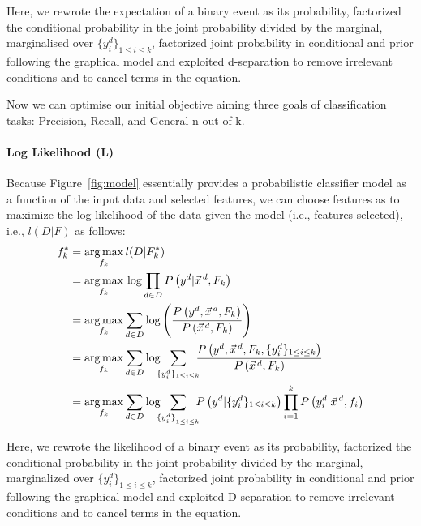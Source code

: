 Here, we rewrote the expectation of a binary event as its probability,
factorized the conditional probability in the joint probability
divided by the marginal, marginalised over $\{y^d_i\}_{1\leq i\leq
  k}$, factorized joint probability in conditional and prior following
the graphical model and exploited d-separation to remove irrelevant
conditions and to cancel terms in the equation.

Now we can optimise our initial objective aiming three goals of classification tasks: Precision, Recall, and General n-out-of-k.
\ENDCOMMENT

\paragraph{Log Likelihood (L)}

Because Figure~\ref{fig:model} essentially provides a probabilistic classifier model as a function
of the input data and selected features, we can choose features as to maximize the log likelihood
of the data given the model (i.e., features selected), i.e., $l(D|F)$ as follows:
{\small 
\begin{align}
f_k^*&=\argmax_{f_k} l(D|F^*_k) \nonumber\\
&=\argmax_{f_k}\,\log\prod_{d\in D}P\left(y^d|\vec{x}^{\,d},F_k\right)\nonumber\\
&=\argmax_{f_k}\sum_{d\in D}\log\left(\frac{P\left(y^d,\vec{x}^{\,d},F_k\right)}{P\left(\vec{x}^{\,d},F_k\right)}\right)\nonumber \\
&=\argmax_{f_k}\sum_{d\in D}\log \!\!\! \sum_{\{y_i^d\}_{1\leq i\leq k}} \!\!\! \frac{P\left(y^d,\vec{x}^{\,d}, F_k,\{y_i^d\}_{1\leq i\leq k}\right)}{P\left(\vec{x}^{\,d},F_k\right)}\nonumber\\
&=\argmax_{f_k}\sum_{d\in D}\log \!\!\! \sum_{{\{y_i^d\}}_{1\leq i\leq k}} \!\!\! P\left(y^d|\{y^d_i\}_{1\leq i\leq k}\right) \prod_{i=1}^kP\left(y_i^d|\vec{x}^{\,d},f_i\right) \label{eq:expect} 
\end{align}}

Here, we rewrote the likelihood of a binary event as its probability,
factorized the conditional probability in the joint probability
divided by the marginal, marginalized over $\{y^d_i\}_{1\leq i\leq
  k}$, factorized joint probability in conditional and prior following
the graphical model and exploited D-separation to remove irrelevant
conditions and to cancel terms in the equation.

